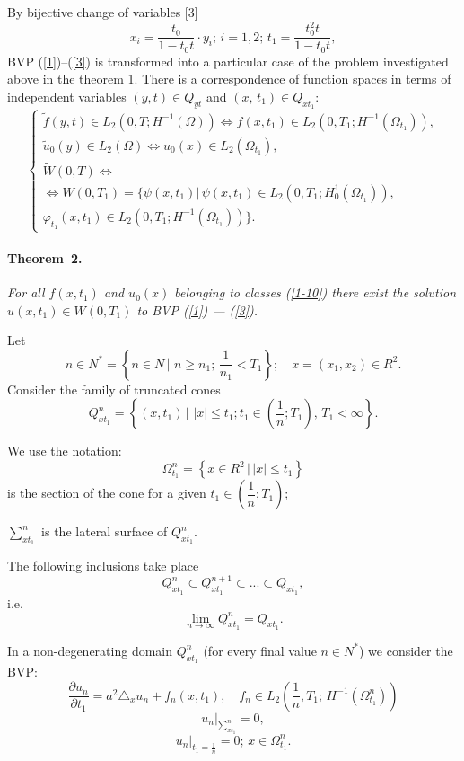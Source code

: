 By bijective change of variables [3]
$$
x_{i}=\frac{t_{0}}{1-t_{0}t}\cdot y_{i};\,i=1,2;\, t_{1}=\frac{t_{0}^{2}t}{1-t_{0}t},
$$
BVP (\ref{1})--(\ref{3}) is transformed into a particular case of the problem investigated above in the theorem 1.
There is a correspondence of function spaces in terms of independent variables $(y,t)\in Q_{yt}$ and $(x,\,t_{1})\in Q_{xt_{1}}$:
\begin{equation}\label{1-10}
\begin{cases}
\tilde{f}(y,t)\in L_{2}(0,T;H^{-1}(\Omega))\Leftrightarrow f(x,t_{1})\in L_{2}(0,T_{1};H^{-1}(\Omega_{t_{1}})), \\
\tilde{u}_{0}(y)\in L_{2}(\Omega)\Leftrightarrow u_{0}(x)\in L_{2}(\Omega_{t_{1}}), \\
\tilde{W}(0,T)\Leftrightarrow \\ \Leftrightarrow W(0,T_{1})=\{\psi(x,t_{1})|\,
\psi(x,t_{1})\in L_{2}(0,T_{1};H_{0}^{1}(\Omega_{t_{1}})), \\
\varphi_{t_{1}}(x,t_{1})\in L_{2}(0,T_{1};H^{-1}(\Omega_{t_{1}}))\}.
\end{cases}
\end{equation}
\paragraph{Theorem~2.}
{\it
For all $f(x,t_{1})$ and $u_{0}(x)$ belonging to classes (\ref{1-10}) there exist the solution $u(x, t_{1})\in W(0, T_{1})$ to BVP (\ref{1}) --- (\ref{3}).
}

Let
$$
n\in N^{*}=\left\{n\in N \,\Big|\,\, n\geq n_{1};\,\frac{1}{n_{1}}<T_{1}\right\}; \quad x=(x_{1}, x_{2})\in R^{2}. $$
Consider the family of truncated cones
$$
Q_{xt_{1}}^{n}=\left\{(x,t_{1})\,\Big|\, \,|x|\leq t_{1}; t_{1}\in \left(\frac{1}{n}; T_{1}\right),\,T_{1}<\infty \right\}.
$$

We use the notation:
$$
\Omega_{t_{1}}^{n}=\left\{x\in R^{2} \,\Big|\, |x|\leq t_{1}\right\}
$$
is the section of the cone for a given $t_{1}\in \left(\dfrac{1}{n}; T_{1}\right)$;

$\sum_{xt_{1}}^{n}$ is the lateral surface of $Q_{xt_{1}}^{n}$.

The following inclusions take place
$$
Q_{xt_{1}}^{n}\subset Q_{xt_{1}}^{n+1}\subset...\subset Q_{xt_{1}},
$$
i.e.
$$
\lim_{n\rightarrow \infty} Q_{xt_{1}}^{n}=Q_{xt_{1}}.
$$

In a non-degenerating domain $Q_{xt_{1}}^{n}$ (for every final value $n\in N^{*}$) we consider the BVP:
\begin{equation}\label{32}
\frac{\partial u_{n}}{\partial t_1}=a^{2}\triangle_x u_{n}+f_{n}(x,t_{1}),
\quad f_{n}\in L_{2}\left(\dfrac{1}{n},T_{1};\,H^{-1}(\Omega_{t_{1}}^{n})\right)
\end{equation}
\begin{equation}\label{33}
u_{n}|_{\sum_{xt_{1}}^{n}}=0,
\end{equation}
\begin{equation}\label{34}
u_{n}|_{t_{1}=\frac{1}{n}}=0;\, x\in\Omega_{t_{1}}^{n}.
\end{equation}

